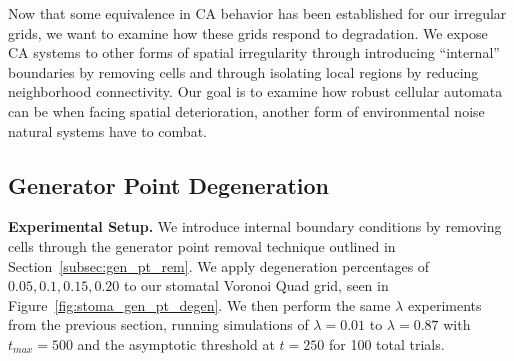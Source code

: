 \documentclass[a4paper,11pt]{article}
\begin{document}
Now that some equivalence in CA behavior has been established for our irregular grids, we want to examine how these grids respond to degradation. We expose CA systems to other forms of spatial irregularity through introducing ``internal'' boundaries by removing cells and through isolating local regions by reducing neighborhood connectivity. Our goal is to examine how robust cellular automata can be when facing spatial deterioration, another form of environmental noise natural systems have to combat.

\subsection{Generator Point Degeneration}
\label{subsec:ch6_gen_pt_degen}


\noindent \textbf{Experimental Setup.} We introduce internal boundary conditions by removing cells through the generator point removal technique outlined in Section~\ref{subsec:gen_pt_rem}. We apply degeneration percentages of $0.05,0.1, 0.15, 0.20$ to our stomatal Voronoi Quad grid, seen in Figure~\ref{fig:stoma_gen_pt_degen}. We then perform the same $\lambda$ experiments from the previous section, running simulations of $\lambda=0.01$ to $\lambda=0.87$ with $t_{max} = 500$ and the asymptotic threshold at $t=250$ for 100 total trials.
\end{document}

